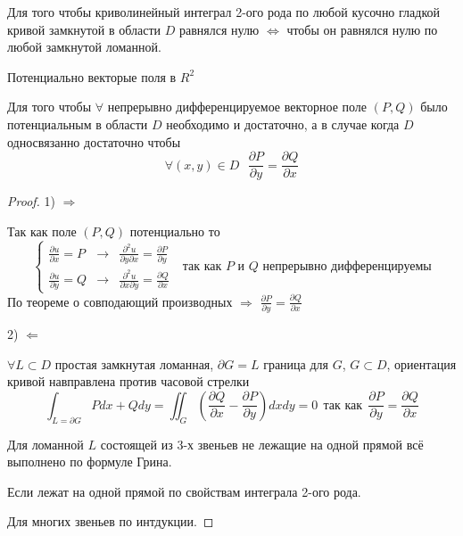 \begin{block}[Следствие]
  Для того чтобы криволинейный интеграл 2-ого рода по любой кусочно гладкой
  кривой замкнутой в области $D$ равнялся нулю $\Leftrightarrow$ чтобы он
  равнялся нулю по любой замкнутой ломанной.
\end{block}

\begin{title}[\Large]
  Потенциально векторые поля в $R^2$
\end{title}

\begin{block}
  Для того чтобы $\forall$ непрерывно дифференцируемое векторное поле $(P, Q)$
  было потенциальным в области $D$ необходимо и достаточно, а в случае когда
  $D$ односвязанно достаточно чтобы
  $$
  \forall (x,y) \in D  ~~~ \frac{\partial P}{\partial y} =
  \frac{\partial Q}{\partial x}
  $$
\end{block}

\begin{proof}
  1) $\Rightarrow$

  Так как поле $(P,Q)$ потенциально то
  $$
  \left\{
  \begin{array}{lcl}
    \frac{\partial u}{\partial x} = P & \to &
    \frac{\partial^2 u}{\partial y \partial x} =
    \frac{\partial P}{\partial y} \\
    \frac{\partial u}{\partial y} = Q & \to &
    \frac{\partial^2 u}{\partial x \partial y} =
    \frac{\partial Q}{\partial x}
  \end{array}
  \right. ~~~ \text{так как $P$ и $Q$ непрерывно дифференцируемы}
  $$
  По теореме о совподающий производных $\Rightarrow$
  $\frac{\partial P}{\partial y} = \frac{\partial Q}{\partial x}$

  2) $\Leftarrow$

  $\forall L \subset D$ простая замкнутая ломанная, $\partial G = L$ граница
  для $G$, $G \subset D$, ориентация кривой навправлена против часовой стрелки
  $$
  \int_{L = \partial G} Pdx + Qdy =
  \iint_G \left( \frac{\partial Q}{\partial x} -
  \frac{\partial P}{\partial y} \right) dx dy = 0
  ~~ \text{так как} ~~
  \frac{\partial P}{\partial y} = \frac{\partial Q}{\partial x}
  $$

  Для ломанной $L$ состоящей из 3-х звеньев не лежащие на одной прямой всё
  выполнено по формуле Грина.

  Если лежат на одной прямой по свойствам интеграла 2-ого рода.

  Для многих звеньев по интдукции.
\end{proof}

